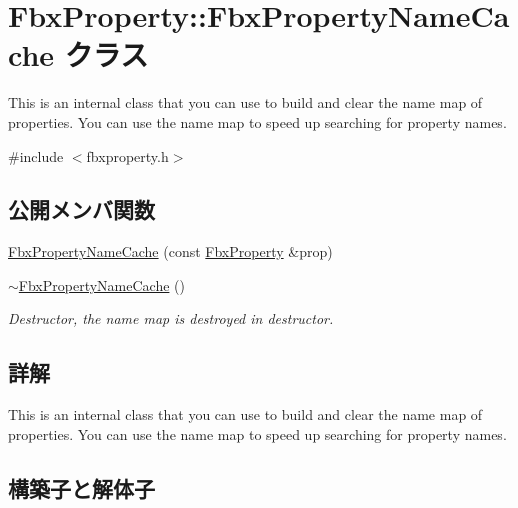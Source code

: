 \hypertarget{class_fbx_property_1_1_fbx_property_name_cache}{}\section{Fbx\+Property\+:\+:Fbx\+Property\+Name\+Cache クラス}
\label{class_fbx_property_1_1_fbx_property_name_cache}


This is an internal class that you can use to build and clear the name map of properties. You can use the name map to speed up searching for property names.  




{\ttfamily \#include $<$fbxproperty.\+h$>$}

\subsection*{公開メンバ関数}
\begin{DoxyCompactItemize}
\item 
\hyperlink{class_fbx_property_1_1_fbx_property_name_cache_a5bce2c1df640d45843d80fb2ad3e1ae0}{Fbx\+Property\+Name\+Cache} (const \hyperlink{class_fbx_property}{Fbx\+Property} \&prop)
\item 
\hyperlink{class_fbx_property_1_1_fbx_property_name_cache_a4750d4813c1a70064a44718946668f25}{$\sim$\+Fbx\+Property\+Name\+Cache} ()
\begin{DoxyCompactList}\small\item\em Destructor, the name map is destroyed in destructor. \end{DoxyCompactList}\end{DoxyCompactItemize}


\subsection{詳解}
This is an internal class that you can use to build and clear the name map of properties. You can use the name map to speed up searching for property names. 

\subsection{構築子と解体子}
\mbox{\label{class_fbx_property_1_1_fbx_property_name_cache_a5bce2c1df640d45843d80fb2ad3e1ae0}} 
